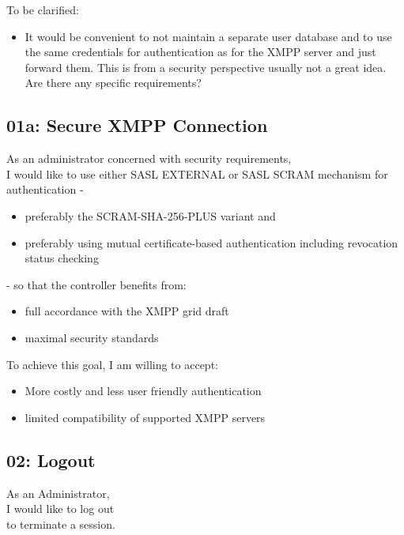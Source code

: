 \noindent To be clarified:

\begin{itemize}
    \item It would be convenient to not maintain a separate user database and to use the same credentials for authentication
            as for the XMPP server and just forward them. This is from a security perspective usually not a great idea. Are there any
            specific requirements?
\end{itemize}

\subsection{01a: Secure XMPP Connection}

As an administrator concerned with security requirements,\\
I would like to use either SASL EXTERNAL or SASL SCRAM mechanism for authentication - \\
\begin{itemize}
    \item preferably the SCRAM-SHA-256-PLUS variant and
    \item preferably using mutual certificate-based authentication including revocation status checking
\end{itemize}

\noindent - so that the controller benefits from:

\begin{itemize}
    \item full accordance with the XMPP grid draft~\cite{ietf-mile-xmpp-grid-05}
    \item maximal security standards
\end{itemize}

\noindent To achieve this goal, I am willing to accept:
\begin{itemize}
    \item More costly and less user friendly authentication
    \item limited compatibility of supported XMPP servers
\end{itemize}

\subsection{02: Logout}

As an Administrator,\\
I would like to log out\\
to terminate a session.

